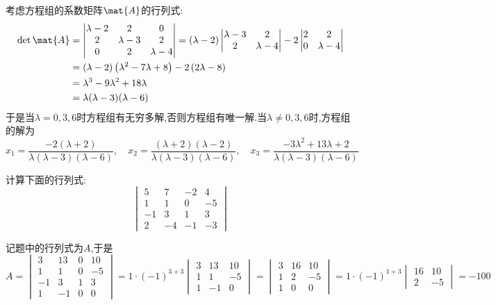 \documentclass{ctexart}
\begin{document}
\begin{solution}
    考虑方程组的系数矩阵$\mat{A}$的行列式:
    \[\begin{aligned}
        \det\mat{A}
        &=\begin{vmatrix}
            \lambda-2&2&0\\
            2&\lambda-3&2\\
            0&2&\lambda-4
        \end{vmatrix}=(\lambda-2)\begin{vmatrix}
            \lambda-3&2\\2&\lambda-4
        \end{vmatrix}-2\begin{vmatrix}
            2&2\\0&\lambda-4
        \end{vmatrix}\\
        &= \left(\lambda-2\right)\left(\lambda^2-7\lambda+8\right)-2\left(2\lambda-8\right) \\
        &= \lambda^3-9\lambda^2+18\lambda \\
        &= \lambda(\lambda-3)(\lambda-6)
    \end{aligned}\]
    于是当$\lambda=0,3,6$时方程组有无穷多解,否则方程组有唯一解.当$\lambda\neq0,3,6$时,方程组的解为
    \[x_1=\dfrac{-2(\lambda+2)}{\lambda(\lambda-3)(\lambda-6)},\quad x_2=\dfrac{(\lambda+2)(\lambda-2)}{\lambda(\lambda-3)(\lambda-6)},\quad x_3=\dfrac{-3\lambda^2+13\lambda+2}{\lambda(\lambda-3)(\lambda-6)}\]
\end{solution}
\begin{homework}[3]
    计算下面的行列式:
    \[\begin{vmatrix}
        5&7&-2&4\\
        1&1&0&-5\\
        -1&3&1&3\\
        2&-4&-1&-3
    \end{vmatrix}\]
\end{homework}
\begin{solution}
    记题中的行列式为$A$,于是
    \[A=\begin{vmatrix}
        3&13&0&10\\
        1&1&0&-5\\
        -1&3&1&3\\
        1&-1&0&0
    \end{vmatrix}=1\cdot(-1)^{3+3}\begin{vmatrix}
        3&13&10\\
        1&1&-5\\
        1&-1&0
    \end{vmatrix}=\begin{vmatrix}
        3&16&10\\
        1&2&-5\\
        1&0&0
    \end{vmatrix}=1\cdot(-1)^{1+3}\begin{vmatrix}
        16&10\\2&-5
    \end{vmatrix}=-100\]
\end{solution}
\end{document}
